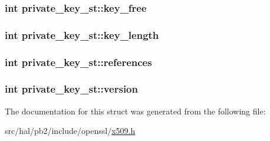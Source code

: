 \subsubsection[{\texorpdfstring{key\+\_\+free}{key_free}}]{\setlength{\rightskip}{0pt plus 5cm}int private\+\_\+key\+\_\+st\+::key\+\_\+free}\hypertarget{structprivate__key__st_a6cba7d7973cf8425493d996dd8464e29}{}\label{structprivate__key__st_a6cba7d7973cf8425493d996dd8464e29}
\subsubsection[{\texorpdfstring{key\+\_\+length}{key_length}}]{\setlength{\rightskip}{0pt plus 5cm}int private\+\_\+key\+\_\+st\+::key\+\_\+length}\hypertarget{structprivate__key__st_a4fd59ffeb31b0bc4acf1330ba4c1cfab}{}\label{structprivate__key__st_a4fd59ffeb31b0bc4acf1330ba4c1cfab}
\subsubsection[{\texorpdfstring{references}{references}}]{\setlength{\rightskip}{0pt plus 5cm}int private\+\_\+key\+\_\+st\+::references}\hypertarget{structprivate__key__st_a96a0fec0281fed6acf1d455f2d5c93ff}{}\label{structprivate__key__st_a96a0fec0281fed6acf1d455f2d5c93ff}
\subsubsection[{\texorpdfstring{version}{version}}]{\setlength{\rightskip}{0pt plus 5cm}int private\+\_\+key\+\_\+st\+::version}\hypertarget{structprivate__key__st_a16bd44f055e649572a0f5b0d62a92219}{}\label{structprivate__key__st_a16bd44f055e649572a0f5b0d62a92219}


The documentation for this struct was generated from the following file\+:\begin{DoxyCompactItemize}
\item 
src/hal/pb2/include/openssl/\hyperlink{x509_8h}{x509.\+h}\end{DoxyCompactItemize}
